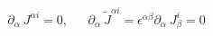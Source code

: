 \begin{equation}
\partial_{\alpha}~J^{\alpha i}=0,~~~~~~~\partial_{\alpha}~\tilde{J}^{\alpha
i}=\epsilon^{\alpha \beta} \partial_{\alpha}~J_{\beta}^{i}=0
\end{equation}

